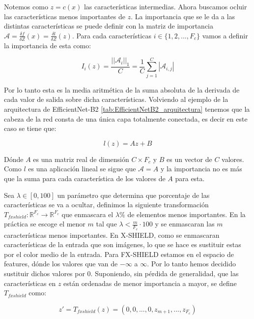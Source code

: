 Notemos como $z=c(x)$ las características intermedias. Ahora buscamos ocluir las características menos importantes de $z$. La importancia que se le da a las distintas características se puede definir con la matriz de importancia $\mathcal{A} = \frac{\delta f}{\delta Z}(x) = \frac{\delta l}{\delta Z}(z)$. Para cada características $i \in \{1,2,...,F_c\}$ vamos a definir la importancia de esta como:

\begin{equation}
I_i(z) =  \frac{||\mathcal{A}_i||_1}{C} = \frac{1}{C}\sum_{j=1}^C |\mathcal{A}_{i,j}| 
\end{equation}

Por lo tanto esta es la media aritmética de la suma absoluta de la derivada de cada valor de salida sobre dicha características. Volviendo al ejemplo de la arquitectura de EfficientNet-B2 \ref{tab:EfficientNetB2_arquitectura} tenemos que la cabeza de la red consta de una única capa totalmente conectada, es decir en este caso se tiene que:

\begin{equation}
l(z) = Az + B
\end{equation}

Dónde $A$ es una matriz real de dimensión $C\times F_c$ y $B$ es un vector de $C$ valores. Como $l$ es una aplicación lineal se sigue que $\mathcal{A}=A$ y la importancia no es más que la suma para cada característica de los valores de $A$ para esta.

Sea $\lambda\in [0,100]$ un parámetro que determina que porcentaje de las características se va a ocultar, definimos la siguiente transformación $T_{fxshield}: \mathbb{R}^{F_c} \rightarrow \mathbb{R}^{F_c}$ que enmascara el $\lambda \%$ de elementos menos importantes. En la práctica se escoge el menor $m$ tal que $\lambda < \frac{m}{F_c} \cdot 100$ y se enmascaran las $m$ características menos importantes. En X-SHIELD, como se enmascaran características de la entrada que son imágenes, lo que se hace es sustituir estas por el color medio de la entrada. Para FX-SHIELD estamos en el espacio de features, dónde los valores que van de $-\infty$ a $\infty$. Por lo tanto hemos decidido sustituir dichos valores por $0$. Suponiendo, sin pérdida de generalidad, que las características en $z$ están ordenadas de menor importancia a mayor, se define $T_{fxshield}$ como:

\begin{equation}
z' = T_{fxshield}(z) = (0,0,...,0,z_{m+1},...,z_{F_c})
\end{equation}

